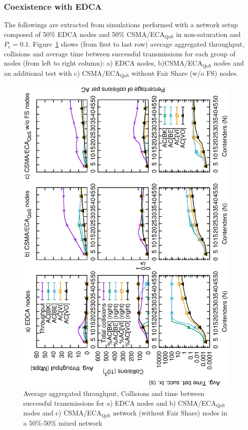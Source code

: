 \subsubsection{Coexistence with EDCA}
The followings are extracted from simulations performed with a network setup composed of 50\% EDCA nodes and 50\% CSMA/ECA$_{\text{QoS}}$ in non-saturation and $P_e=0.1$. Figure~\ref{fig:multiplotCombinedUnsat} shows (from first to last row) average aggregated throughput, collisions and average time between successful transmissions for each group of nodes (from left to right column): a) EDCA nodes, b)CSMA/ECA$_{\text{QoS}}$ nodes and an additional test with c) CSMA/ECA$_{\text{QoS}}$ without Fair Share (w/o FS) nodes.

\begin{figure}[tb]
	\centering
		\includegraphics[width=0.55\linewidth,angle = -90]{figures/multiplot-combined-unsat-error-0-1.eps}
		\caption{Average aggregated throughput, Collisions and time between successful transmissions for a) EDCA nodes and b) CSMA/ECA$_{\text{QoS}}$ nodes and c) CSMA/ECA$_{\text{QoS}}$ network (without Fair Share) nodes in a 50\%-50\% mixed network}
		\label{fig:multiplotCombinedUnsat}
\end{figure}


